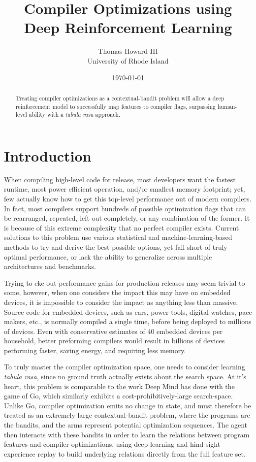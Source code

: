 \documentclass{article}
\title{Compiler Optimizations using Deep Reinforcement Learning}
\author{
    Thomas Howard III  \\
    University of Rhode Island  \\
}
\date{\today}
\begin{document}
\maketitle

\begin{abstract}
Treating compiler optimizations as a contextual-bandit problem will allow a deep reinforcement model to successfully map features to compiler flags, surpassing human-level ability with a \emph{tabula rasa} approach. 
\end{abstract}

\section{Introduction}
When compiling high-level code for release, most developers want the fastest runtime, most power efficient operation, and/or smallest memory footprint; yet, few actually know how to get this top-level performance out of modern compilers. In fact, most compilers support hundreds of possible optimization flags that can be rearranged, repeated, left out completely, or any combination of the former. It is because of this extreme complexity that no perfect compiler exists. Current solutions to this problem use various statistical and machine-learning-based methods to try and derive the best possible options, yet fall short of truly optimal performance, or lack the ability to generalize across multiple architectures and benchmarks.

Trying to eke out performance gains for production releases may seem trivial to some, however, when one considers the impact this may have on embedded devices, it is impossible to consider the impact as anything less than massive. Source code for embedded devices, such as cars, power tools, digital watches, pace makers, etc., is normally compiled a single time, before being deployed to millions of devices. Even with conservative estimates of 40 embedded devices per household, better preforming compilers would result in billions of devices performing faster, saving energy, and requiring less memory. 

To truly master the compiler optimization space, one needs to consider learning \emph{tabula rasa}, since no ground truth actually exists about the search space. At it's heart, this problem is comparable to the work Deep Mind has done with the game of Go, which similarly exhibits a cost-prohibitively-large search-space. Unlike Go, compiler optimization emits no change in state, and must therefore be treated as an extremely large contextual-bandit problem, where the programs are the bandits, and the arms represent potential optimization sequences. The agent then interacts with these bandits in order to learn the relations between program features and compiler optimizations, using deep learning and hind-sight experience replay to build underlying relations directly from the full feature set.
\end{document}
